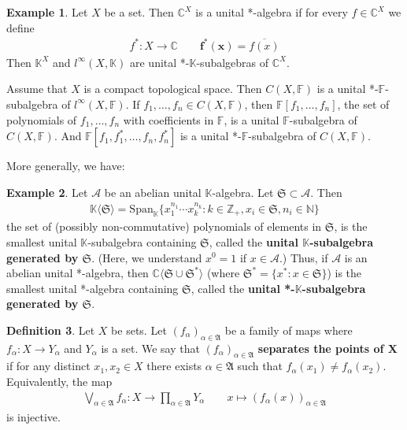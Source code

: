 \documentclass[12pt,b5paper,notitlepage]{article}
\theoremstyle{definition}
\newtheorem{df}{Definition}[section]
\newtheorem{eg}[df]{Example}
\theoremstyle{plain}
\newcommand{\fk}{\mathfrak}
\newcommand{\ovl}{\overline}
\newcommand{\Span}{\mathrm{Span}}
\newcommand{\bk}[1]{\langle {#1}\rangle}
\newcommand{\scr}{\mathscr}
\newcommand{\Kbb}{\mathbb K}
\newcommand{\Cbb}{\mathbb C}
\newcommand{\Nbb}{\mathbb N}
\newcommand{\Zbb}{\mathbb Z}
\newcommand{\Fbb}{\mathbb F}
\newcommand{\hqed}{\hfill\qedsymbol}
\numberwithin{equation}{section}
\begin{document}
\begin{eg}
Let $X$ be a set. Then $\Cbb^X$ is a unital *-algebra if for every $f\in\Cbb^X$ we define \index{f@$f^*(x)=\ovl{f(x)}$}
\begin{align}\label{eq33}
f^*:X\rightarrow\Cbb\qquad \pmb{f^*(x)}=\ovl{f(x)}
\end{align}
Then $\Kbb^X$ and $l^\infty(X,\Kbb)$ are unital *-$\Kbb$-subalgebras of $\Cbb^X$.

Assume that $X$ is a compact topological space. Then $C(X,\Fbb)$ is a unital *-$\Fbb$-subalgebra of $l^\infty(X,\Fbb)$. If $f_1,\dots,f_n\in C(X,\Fbb)$, then $\Fbb[f_1,\dots,f_n]$, the set of polynomials of $f_1,\dots,f_n$ with coefficients in $\Fbb$, is a unital $\Fbb$-subalgebra of $C(X,\Fbb)$. And $\Fbb[f_1,f_1^*,\dots,f_n,f_n^*]$ is a unital *-$\Fbb$-subalgebra of $C(X,\Fbb)$.  \hqed
\end{eg}


More generally, we have:

\begin{eg}
Let $\scr A$ be an abelian unital $\Kbb$-algebra. Let $\fk S\subset\scr A$. Then \index{FS@$\Kbb\bk{\fk S}$}
\begin{align}
\Kbb\bk{\fk S}=\Span_\Kbb\{x_1^{n_1}\cdots x_k^{n_k}:k\in\Zbb_+,x_i\in\fk S,n_i\in\Nbb\}
\end{align}
the set of (possibly non-commutative) polynomials of elements in $\fk S$, is the smallest unital $\Kbb$-subalgebra containing $\fk S$, called the \textbf{unital $\Kbb$-subalgebra generated by $\fk S$}.  (Here, we understand $x^0=1$ if $x\in\scr A$.) Thus, if $\scr A$ is an abelian unital *-algebra, then $\Cbb\bk{\fk S\cup\fk S^*}$ (where $\fk S^*=\{x^*:x\in\fk S\}$) is the smallest unital *-algebra containing $\fk S$, called the \textbf{unital *-$\Kbb$-subalgebra generated by $\fk S$}.
\end{eg}



\begin{df}
Let $X$ be sets. Let $(f_\alpha)_{\alpha\in\fk A}$ be a family of maps where $f_\alpha:X\rightarrow Y_\alpha$ and $Y_\alpha$ is a set.  We say that $(f_\alpha)_{\alpha\in\fk A}$ \textbf{separates the points of $\pmb X$}  if for any distinct $x_1,x_2\in X$ there exists $\alpha\in\fk A$ such that $f_\alpha(x_1)\neq f_\alpha(x_2)$. Equivalently, the map
\begin{gather}
\bigvee_{\alpha\in\fk A}f_\alpha:X\rightarrow \prod_{\alpha\in\fk A}Y_\alpha\qquad x\mapsto (f_\alpha(x))_{\alpha\in\fk A}
\end{gather}
is injective.
\end{df}
\end{document}
